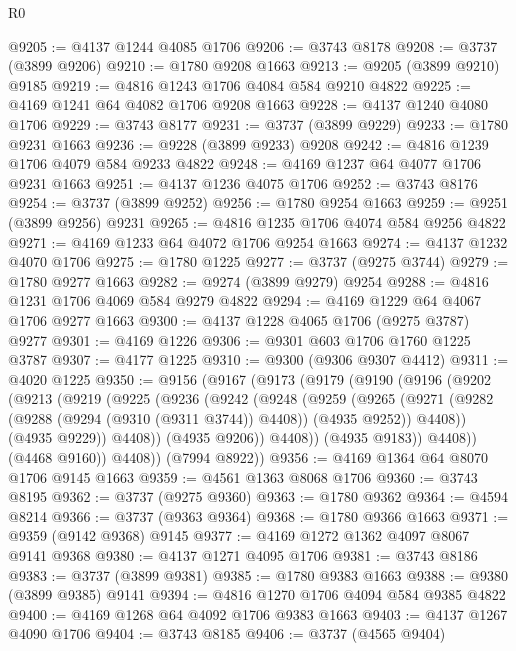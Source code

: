 \begin{lexlean}{R0}
\begin{coremodule}
@9205 := @4137 @1244 @4085 @1706
@9206 := @3743 @8178
@9208 := @3737 (@3899 @9206)
@9210 := @1780 @9208 @1663
@9213 := @9205 (@3899 @9210) @9185
@9219 := @4816 @1243 @1706 @4084 @584 @9210 @4822
@9225 := @4169 @1241 @64 @4082 @1706 @9208 @1663
@9228 := @4137 @1240 @4080 @1706
@9229 := @3743 @8177
@9231 := @3737 (@3899 @9229)
@9233 := @1780 @9231 @1663
@9236 := @9228 (@3899 @9233) @9208
@9242 := @4816 @1239 @1706 @4079 @584 @9233 @4822
@9248 := @4169 @1237 @64 @4077 @1706 @9231 @1663
@9251 := @4137 @1236 @4075 @1706
@9252 := @3743 @8176
@9254 := @3737 (@3899 @9252)
@9256 := @1780 @9254 @1663
@9259 := @9251 (@3899 @9256) @9231
@9265 := @4816 @1235 @1706 @4074 @584 @9256 @4822
@9271 := @4169 @1233 @64 @4072 @1706 @9254 @1663
@9274 := @4137 @1232 @4070 @1706
@9275 := @1780 @1225
@9277 := @3737 (@9275 @3744)
@9279 := @1780 @9277 @1663
@9282 := @9274 (@3899 @9279) @9254
@9288 := @4816 @1231 @1706 @4069 @584 @9279 @4822
@9294 := @4169 @1229 @64 @4067 @1706 @9277 @1663
@9300 := @4137 @1228 @4065 @1706 (@9275 @3787) @9277
@9301 := @4169 @1226
@9306 := @9301 @603 @1706 @1760 @1225 @3787
@9307 := @4177 @1225
@9310 := @9300 (@9306 @9307 @4412)
@9311 := @4020 @1225
@9350 := @9156
    (@9167
      (@9173
        (@9179
          (@9190
            (@9196
              (@9202
                (@9213
                  (@9219
                    (@9225
                      (@9236
                        (@9242
                          (@9248
                            (@9259
                              (@9265
                                (@9271
                                  (@9282 (@9288 (@9294 (@9310 (@9311 @3744)) @4408)) (@4935 @9252))
                                  @4408))
                              (@4935 @9229))
                            @4408))
                        (@4935 @9206))
                      @4408))
                  (@4935 @9183))
                @4408))
            (@4468 @9160))
          @4408))
      (@7994 @8922))
@9356 := @4169 @1364 @64 @8070 @1706 @9145 @1663
@9359 := @4561 @1363 @8068 @1706
@9360 := @3743 @8195
@9362 := @3737 (@9275 @9360)
@9363 := @1780 @9362
@9364 := @4594 @8214
@9366 := @3737 (@9363 @9364)
@9368 := @1780 @9366 @1663
@9371 := @9359 (@9142 @9368) @9145
@9377 := @4169 @1272 @1362 @4097 @8067 @9141 @9368
@9380 := @4137 @1271 @4095 @1706
@9381 := @3743 @8186
@9383 := @3737 (@3899 @9381)
@9385 := @1780 @9383 @1663
@9388 := @9380 (@3899 @9385) @9141
@9394 := @4816 @1270 @1706 @4094 @584 @9385 @4822
@9400 := @4169 @1268 @64 @4092 @1706 @9383 @1663
@9403 := @4137 @1267 @4090 @1706
@9404 := @3743 @8185
@9406 := @3737 (@4565 @9404)

\end{coremodule}
\end{lexlean}
